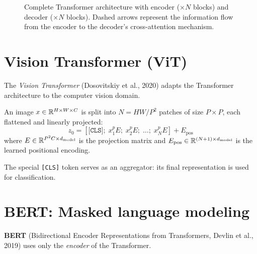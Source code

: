 \begin{figure}[htbp]
\caption{Complete Transformer architecture with encoder ($\times N$ blocks) and decoder ($\times N$ blocks). Dashed arrows represent the information flow from the encoder to the decoder's cross-attention mechanism.}
\label{fig:transformer-architecture}
\end{figure}

\section{Vision Transformer (ViT)}
\label{sec:vit}

The \emph{Vision Transformer} (Dosovitskiy et al., 2020) adapts the Transformer architecture to the computer vision domain.

\begin{definition}
An image $x \in \mathbb{R}^{H \times W \times C}$ is split into $N = HW/P^2$ patches of size $P \times P$, each flattened and linearly projected:
\begin{equation}
z_0 = [\texttt{[CLS]};\; x_1^p E;\; x_2^p E;\; \ldots;\; x_N^p E] + E_{\text{pos}}
\end{equation}
where $E \in \mathbb{R}^{P^2 C \times d_{\text{model}}}$ is the projection matrix and $E_{\text{pos}} \in \mathbb{R}^{(N+1) \times d_{\text{model}}}$ is the learned positional encoding.
\end{definition}

\begin{remark}
The special \texttt{[CLS]} token serves as an aggregator: its final representation is used for classification.
\end{remark}

\section{BERT: Masked language modeling}
\label{sec:bert}

\textbf{BERT} (Bidirectional Encoder Representations from Transformers, Devlin et al., 2019) uses only the \emph{encoder} of the Transformer.


